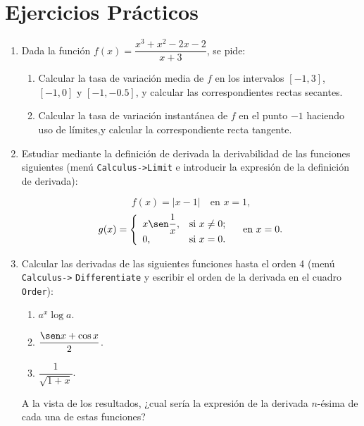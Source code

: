 \documentclass[a4paper]{article}
\begin{document}
\section*{Ejercicios Prácticos}
\begin{enumerate}[leftmargin=*]
\item Dada la función $f(x)=\dfrac{x^3+x^2-2x-2}{x+3}$, se pide:
\begin{enumerate}
\item Calcular la tasa de variación media de $f$ en los intervalos $[-1,3]$, $[-1,0]$ y $[-1,-0.5]$, y calcular las correspondientes rectas secantes. 
\item Calcular la tasa de variación instantánea de $f$ en el punto $-1$ haciendo uso de límites,y calcular la correspondiente recta tangente.
\end{enumerate}

\item Estudiar mediante la definición de derivada la derivabilidad de las funciones
siguientes (menú \texttt{Calculus->Limit} e introducir la expresión de la definición de derivada):


\[
f(x)=|x-1| \quad \textrm{en $x=1$,}
\]
\[
g(x)=\left\{%
\begin{array}{ll}
   x \sen\dfrac{1}{x}, & \hbox{si $x\neq 0$;} \\
   0, & \hbox{si $x=0$.} \\
\end{array}%
\right. \quad \textrm{en $x=0$.}
\]

\item  Calcular las derivadas de las siguientes funciones hasta el orden 4 (menú  \texttt{Calculus->} \texttt{Differentiate} y escribir el orden de la derivada en el cuadro \texttt{Order}):

\begin{enumerate}
\item  $a^x\log a$.

\item  $\dfrac{\sen x +\cos x}{2}$.

\item  $\dfrac{1}{\sqrt{1+x}}$.
\end{enumerate}

A la vista de los resultados, ¿cual sería la expresión de la
derivada $n$-ésima de cada una de estas funciones?

\end{enumerate}
\end{document}

